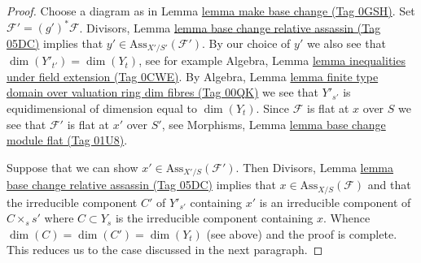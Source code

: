 \documentclass{amsart}
\theoremstyle{plain}
\theoremstyle{definition}
\theoremstyle{remark}
\numberwithin{equation}{subsection}
\begin{document}
\begin{proof}
Choose a diagram as in Lemma \href{https://stacks.math.columbia.edu/tag/0GSH}{lemma make base change (Tag 0GSH)}.
Set $\mathcal{F}' = (g')^*\mathcal{F}$.
Divisors, Lemma \href{https://stacks.math.columbia.edu/tag/05DC}{lemma base change relative assassin (Tag 05DC)}
implies that $y' \in \text{Ass}_{X'/S'}(\mathcal{F}')$.
By our choice of $y'$ we also see that $\dim(Y'_{t'}) = \dim(Y_t)$,
see for example Algebra, Lemma
\href{https://stacks.math.columbia.edu/tag/0CWE}{lemma inequalities under field extension (Tag 0CWE)}.
By Algebra, Lemma
\href{https://stacks.math.columbia.edu/tag/00QK}{lemma finite type domain over valuation ring dim fibres (Tag 00QK)}
we see that $Y'_{s'}$ is equidimensional of dimension equal to $\dim(Y_t)$.
Since $\mathcal{F}$ is flat at $x$ over $S$ we see that
$\mathcal{F}'$ is flat at $x'$ over $S'$, see
Morphisms, Lemma \href{https://stacks.math.columbia.edu/tag/01U8}{lemma base change module flat (Tag 01U8)}.

\medskip\noindent
Suppose that we can show $x' \in \text{Ass}_{X'/S}(\mathcal{F}')$. Then
Divisors, Lemma \href{https://stacks.math.columbia.edu/tag/05DC}{lemma base change relative assassin (Tag 05DC)}
implies that $x \in \text{Ass}_{X/S}(\mathcal{F})$ and that
the irreducible component $C'$ of $Y'_{s'}$ containing $x'$
is an irreducible component of $C \times_s s'$ where $C \subset Y_s$
is the irreducible component containing $x$.
Whence $\dim(C) = \dim(C') = \dim(Y_t)$ (see above) and the
proof is complete.
This reduces us to the case discussed in the next paragraph.


\end{proof}
\end{document}
